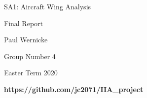 \begin{titlepage}
    \begin{center}
 
        \LARGE
        SA1: Aircraft Wing Analysis
        
        \vspace{0.1cm}
        
        \LARGE
        
        Final Report
        
        \vspace{0.4cm}
        
        \large
        
        Paul Wernicke
        
        \vspace{0cm}
        
        Group Number 4
        
        \vspace{0.3cm}
        
        Easter Term 2020
        
        \vspace{0.3cm}
        
        \textbf{https://github.com/jc2071/IIA\_project}
        
        \vspace{0.3cm}
        
        
        
        
    \end{center}
\end{titlepage}